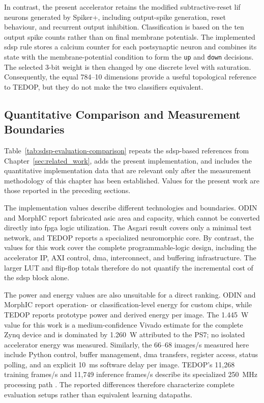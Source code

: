 In contrast, the present accelerator retains the modified subtractive-reset \gls{lif} neurons generated by Spiker+, including output-spike generation, reset behaviour, and recurrent output inhibition. Classification is based on the ten output spike counts rather than on final membrane potentials. The implemented \gls{sdsp} rule stores a calcium counter for each postsynaptic neuron and combines its state with the membrane-potential condition to form the \texttt{up} and \texttt{down} decisions. The selected 3-bit weight is then changed by one discrete level with saturation. Consequently, the equal 784--10 dimensions provide a useful topological reference to TEDOP, but they do not make the two classifiers equivalent.

\subsection{Quantitative Comparison and Measurement Boundaries}

Table~\ref{tab:sdsp-evaluation-comparison} repeats the \gls{sdsp}-based references from Chapter~\ref{sec:related_work}, adds the present implementation, and includes the quantitative implementation data that are relevant only after the measurement methodology of this chapter has been established. Values for the present work are those reported in the preceding sections.



The implementation values describe different technologies and boundaries. ODIN and MorphIC report fabricated \gls{asic} area and capacity, which cannot be converted directly into \gls{fpga} logic utilization. The Asgari result covers only a minimal test network, and TEDOP reports a specialized neuromorphic core. By contrast, the values for this work cover the complete programmable-logic design, including the accelerator IP, AXI control, \gls{dma}, interconnect, and buffering infrastructure. The larger LUT and flip-flop totals therefore do not quantify the incremental cost of the \gls{sdsp} block alone.

The power and energy values are also unsuitable for a direct ranking. ODIN and MorphIC report operation- or classification-level energy for custom chips, while TEDOP reports prototype power and derived energy per image. The 1.445~W value for this work is a medium-confidence Vivado estimate for the complete Zynq device and is dominated by 1.260~W attributed to the PS7; no isolated accelerator energy was measured. Similarly, the 66--68 images/s measured here include Python control, buffer management, \gls{dma} transfers, register access, status polling, and an explicit 10~ms software delay per image. TEDOP's 11,268 training frames/s and 11,749 inference frames/s describe its specialized 250~MHz processing path \cite{Shi2022TEDOP}. The reported differences therefore characterize complete evaluation setups rather than equivalent learning datapaths.

